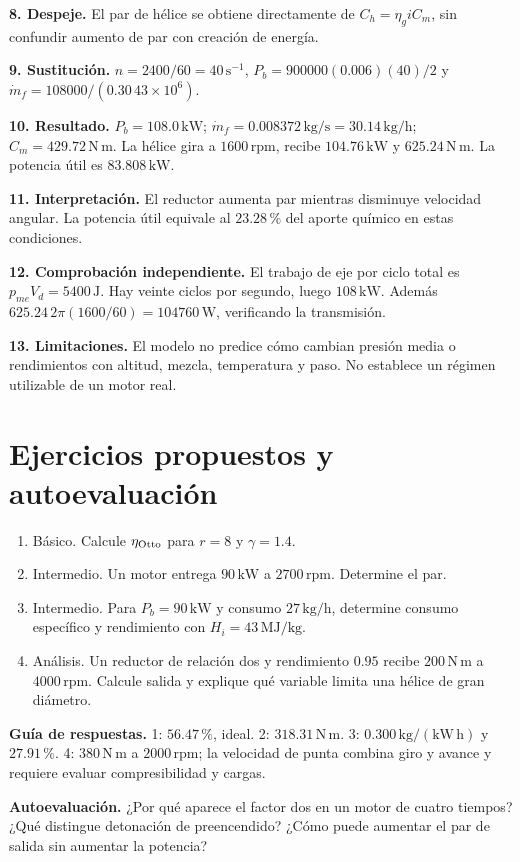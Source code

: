 \textbf{8. Despeje.} El par de hélice se obtiene directamente de $C_h=\eta_g i C_m$, sin confundir aumento de par con creación de energía.

\textbf{9. Sustitución.} $n=2400/60=40\,\mathrm{s^{-1}}$, $P_b=900000(0.006)(40)/2$ y $\dot m_f=108000/(0.30\,43\times10^6)$.

\textbf{10. Resultado.} $P_b=108.0\,\mathrm{kW}$; $\dot m_f=0.008372\,\mathrm{kg/s}=30.14\,\mathrm{kg/h}$; $C_m=429.72\,\mathrm{N\,m}$. La hélice gira a $1600\,\mathrm{rpm}$, recibe $104.76\,\mathrm{kW}$ y $625.24\,\mathrm{N\,m}$. La potencia útil es $83.808\,\mathrm{kW}$.

\textbf{11. Interpretación.} El reductor aumenta par mientras disminuye velocidad angular. La potencia útil equivale al $23.28\,\text{\%}$ del aporte químico en estas condiciones.

\textbf{12. Comprobación independiente.} El trabajo de eje por ciclo total es $p_{me}V_d=5400\,\mathrm{J}$. Hay veinte ciclos por segundo, luego $108\,\mathrm{kW}$. Además $625.24\,2\pi(1600/60)=104760\,\mathrm{W}$, verificando la transmisión.

\textbf{13. Limitaciones.} El modelo no predice cómo cambian presión media o rendimientos con altitud, mezcla, temperatura y paso. No establece un régimen utilizable de un motor real.

\section{Ejercicios propuestos y autoevaluación}
\begin{enumerate}
\item Básico. Calcule $\eta_{\rm Otto}$ para $r=8$ y $\gamma=1.4$.
\item Intermedio. Un motor entrega $90\,\mathrm{kW}$ a $2700\,\mathrm{rpm}$. Determine el par.
\item Intermedio. Para $P_b=90\,\mathrm{kW}$ y consumo $27\,\mathrm{kg/h}$, determine consumo específico y rendimiento con $H_i=43\,\mathrm{MJ/kg}$.
\item Análisis. Un reductor de relación dos y rendimiento $0.95$ recibe $200\,\mathrm{N\,m}$ a $4000\,\mathrm{rpm}$. Calcule salida y explique qué variable limita una hélice de gran diámetro.
\end{enumerate}
\textbf{Guía de respuestas.} 1: $56.47\,\text{\%}$, ideal. 2: $318.31\,\mathrm{N\,m}$. 3: $0.300\,\mathrm{kg/(kW\,h)}$ y $27.91\,\text{\%}$. 4: $380\,\mathrm{N\,m}$ a $2000\,\mathrm{rpm}$; la velocidad de punta combina giro y avance y requiere evaluar compresibilidad y cargas.

\textbf{Autoevaluación.} ¿Por qué aparece el factor dos en un motor de cuatro tiempos? ¿Qué distingue detonación de preencendido? ¿Cómo puede aumentar el par de salida sin aumentar la potencia?

